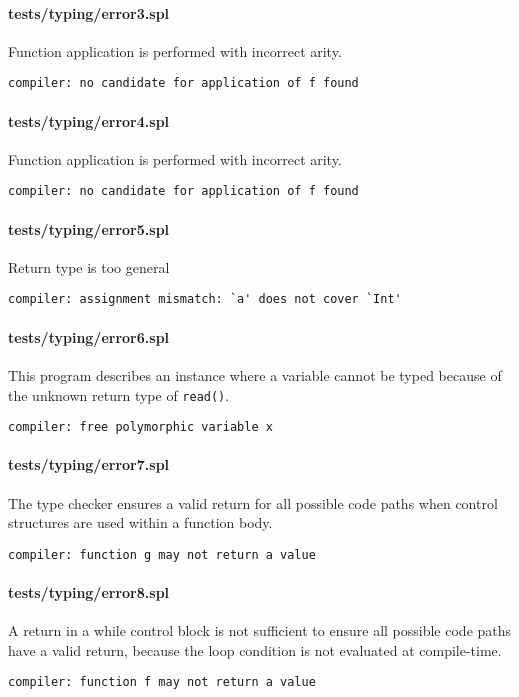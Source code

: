 \documentclass[a4paper]{article}
\begin{document}
\paragraph{tests/typing/error3.spl} Function application is performed with incorrect arity.
    \begin{verbatim}
compiler: no candidate for application of f found
    \end{verbatim}

\paragraph{tests/typing/error4.spl} Function application is performed with incorrect arity.
    \begin{verbatim}
compiler: no candidate for application of f found
    \end{verbatim}

\paragraph{tests/typing/error5.spl} Return type is too general
    \begin{verbatim}
compiler: assignment mismatch: `a' does not cover `Int'
    \end{verbatim}

\paragraph{tests/typing/error6.spl} This program describes an instance where a variable cannot be typed because of the unknown return type of \verb|read()|.
    \begin{verbatim}
compiler: free polymorphic variable x
    \end{verbatim}

\paragraph{tests/typing/error7.spl} The type checker ensures a valid return for all possible code paths when control structures are used within a function body.
    \begin{verbatim}
compiler: function g may not return a value
    \end{verbatim}

\paragraph{tests/typing/error8.spl} A return in a while control block is not sufficient to ensure all possible code paths have a valid return, because the loop condition is not evaluated at compile-time.
    \begin{verbatim}
compiler: function f may not return a value
    \end{verbatim}
\end{document}
